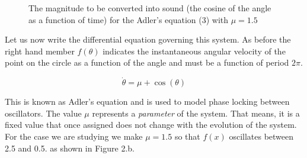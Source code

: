 \documentclass{article}
\begin{document}
\begin{figure}[h]
    \centering
    \caption{The magnitude to be converted into sound (the cosine of the angle as a function of time) for the Adler's equation (3) with $\mu=1.5$} 
    \label{adler2}
\end{figure}

Let us now write the differential equation governing this system. As before the right hand member $f(\theta)$ indicates the instantaneous angular velocity of the point on the circle as a function of the angle and must be a function of period $2\pi$. 

\begin{equation}
\dot\theta = \mu + \cos(\theta)
\end{equation}

This is known as Adler's equation and is used to model phase locking between oscillators. 
The value $\mu$ represents a {\em parameter} of the system. 
That means, it is a fixed value that once assigned does not change with the evolution of the system. 
For the case we are studying we make $\mu=1.5$ so that $f(x)$ oscillates between 2.5 and 0.5. as shown in Figure 2.b.
\end{document}
